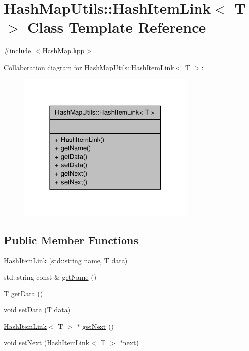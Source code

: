 \hypertarget{class_hash_map_utils_1_1_hash_item_link}{\section{Hash\-Map\-Utils\-:\-:Hash\-Item\-Link$<$ T $>$ Class Template Reference}
\label{class_hash_map_utils_1_1_hash_item_link}
}


{\ttfamily \#include $<$Hash\-Map.\-hpp$>$}



Collaboration diagram for Hash\-Map\-Utils\-:\-:Hash\-Item\-Link$<$ T $>$\-:
\nopagebreak
\begin{figure}[H]
\begin{center}
\leavevmode
\includegraphics[width=250pt]{class_hash_map_utils_1_1_hash_item_link__coll__graph}
\end{center}
\end{figure}
\subsection*{Public Member Functions}
\begin{DoxyCompactItemize}
\item 
\hyperlink{class_hash_map_utils_1_1_hash_item_link_a05b2439be19a8b3cd0c89c232f4b6a67}{Hash\-Item\-Link} (std\-::string name, T data)
\item 
std\-::string const \& \hyperlink{class_hash_map_utils_1_1_hash_item_link_a6b954b31f27fd52a7277019397c14409}{get\-Name} ()
\item 
T \hyperlink{class_hash_map_utils_1_1_hash_item_link_a2dd174171b1c958a00bf48bcd5a8a9f7}{get\-Data} ()
\item 
void \hyperlink{class_hash_map_utils_1_1_hash_item_link_a96655dcffac5172a523be11c2b6a1aca}{set\-Data} (T data)
\item 
\hyperlink{class_hash_map_utils_1_1_hash_item_link}{Hash\-Item\-Link}$<$ T $>$ $\ast$ \hyperlink{class_hash_map_utils_1_1_hash_item_link_a60ac00e44d88e971b194ffbea03663e0}{get\-Next} ()
\item 
void \hyperlink{class_hash_map_utils_1_1_hash_item_link_a5d479e2c10ad680298652fab089cfbd7}{set\-Next} (\hyperlink{class_hash_map_utils_1_1_hash_item_link}{Hash\-Item\-Link}$<$ T $>$ $\ast$next)
\end{DoxyCompactItemize}


